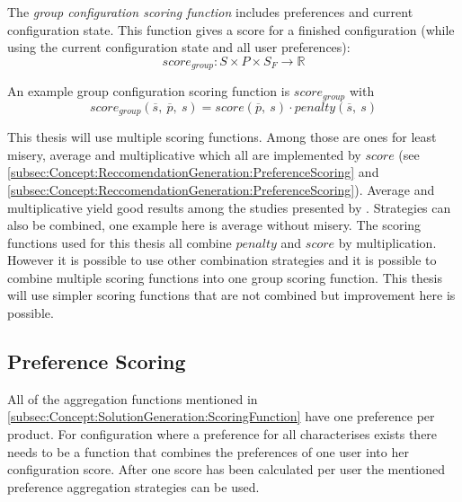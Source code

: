 \label{subsec:Concept:SolutionGeneration:ScoringFunction}

The \emph{group configuration scoring function} includes preferences and current configuration state. This function gives a score for a finished configuration (while using the current configuration state and all user preferences):
\begin{equation}
    score_{group}: S \times P \times S_F \to \mathbb{R}
\end{equation}

An example group configuration scoring function is $score_{group}$ with
\begin{equation}
    score_{group}(\overline{s},\ \overline{p},\ s) = score(\overline{p},\ s) \cdot penalty(\overline{s},\ s)
\end{equation} 

This thesis will use multiple scoring functions. Among those are ones for least misery, average and multiplicative which all are implemented by $score$ (see \autoref{subsec:Concept:ReccomendationGeneration:PreferenceScoring} and \autoref{subsec:Concept:ReccomendationGeneration:PreferenceScoring}). Average and multiplicative yield good results among the studies presented by \citeauthor{Masthoff2015} \cite{Masthoff2015}. Strategies can also be combined, one example here is average without misery. The scoring functions used for this thesis all combine $penalty$ and $score$ by multiplication. However it is possible to use other combination strategies and it is possible to combine multiple scoring functions into one group scoring function. This thesis will use simpler scoring functions that are not combined but improvement here is possible.

\subsection{Preference Scoring}
\label{subsec:Concept:ReccomendationGeneration:PreferenceScoring}

All of the aggregation functions mentioned in \autoref{subsec:Concept:SolutionGeneration:ScoringFunction} have one preference per product. For configuration where a preference for all characterises exists there needs to be a function that combines the preferences of one user into her configuration score. After one score has been calculated per user the mentioned preference aggregation strategies can be used.

